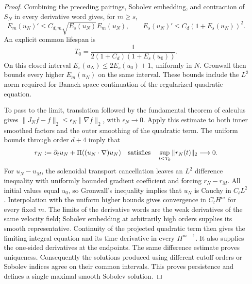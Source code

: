 \documentclass[11pt]{article}
\theoremstyle{definition}
\begin{document}
\begin{proof}
Combining the preceding pairings, Sobolev embedding, and contraction of
$S_N$ in every derivative word gives, for $m\geq s$,
\[
 E_m(u_N)'\leq C_{d,m}\sqrt{E_s(u_N)}E_m(u_N),\qquad
 E_s(u_N)'\leq C_d(1+E_s(u_N))^2.
\]
An explicit common lifespan is
\[
 T_0=\frac{1}{2(1+C_d)(1+E_s(u_0))}.
\]
On this closed interval $E_s(u_N)\leq2E_s(u_0)+1$, uniformly in $N$.
Gronwall then bounds every higher $E_m(u_N)$ on the same interval.
These bounds include the $L^2$ norm required for Banach-space
continuation of the regularized quadratic equation.

To pass to the limit, translation followed by the fundamental theorem
of calculus gives
$\|J_Nf-f\|_2\leq\epsilon_N\|\nabla f\|_2$, with
$\epsilon_N\to0$. Apply this estimate to both inner smoothed factors
and the outer smoothing of the quadratic term. The uniform bounds
through order $d+4$ imply that
\[
 r_N:=\partial_tu_N+\Pi((u_N\cdot\nabla)u_N)
 \quad\hbox{satisfies}\quad
 \sup_{t\leq T_0}\|r_N(t)\|_2\longrightarrow0.
\]
For $u_N-u_M$, the solenoidal transport cancellation leaves an $L^2$
difference inequality with uniformly bounded gradient coefficient and
forcing $r_N-r_M$. All initial values equal $u_0$, so Gronwall's inequality implies that
$u_N$ is Cauchy in $C_tL^2$. Interpolation with the uniform higher bounds
gives convergence in $C_tH^m$ for every fixed $m$. The limits of the
derivative words are the weak derivatives of the same velocity field;
Sobolev embedding at arbitrarily high orders supplies its smooth
representative. Continuity of the projected quadratic term then gives
the limiting integral equation and its time derivative in every
$H^{m-1}$. It also supplies the one-sided derivatives at the endpoints.
The same difference estimate proves uniqueness. Consequently
the solutions produced using different cutoff orders or Sobolev indices
agree on their common intervals. This proves persistence and defines a
single maximal smooth Sobolev solution.
\end{proof}
\end{document}
